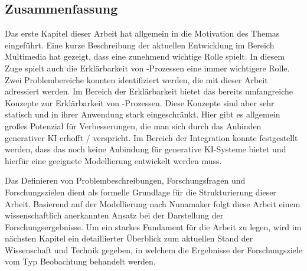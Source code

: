 
%


\subsection{Zusammenfassung}
\label{sec1:intro:subsec:summary}
Das erste Kapitel dieser Arbeit hat allgemein in die Motivation des Themas eingeführt.
Eine kurze Beschreibung der aktuellen Entwicklung im Bereich Multimedia hat gezeigt, dass \mmir{} eine zunehmend wichtige Rolle spielt.
In diesem Zuge spielt auch die Erklärbarkeit von \mmir{}-Prozessen eine immer wichtigere Rolle.
Zwei Problembereiche konnten identifiziert werden, die mit dieser Arbeit adressiert werden.
Im Bereich der Erklärbarkeit bietet das \gmaf{} bereits umfangreiche Konzepte zur Erklärbarkeit von \mmir{}-Prozessen.
Diese Konzepte sind aber sehr statisch und in ihrer Anwendung stark eingeschränkt.
Hier gibt es allgemein großes Potenzial für Verbesserungen, die man sich durch das Anbinden generativer KI erhofft / verspricht.
Im Bereich der Integration konnte festgestellt werden, dass das \gmaf{} noch keine Anbindung für generative KI-Systeme bietet und hierfür eine geeignete Modellierung entwickelt werden muss.

Das Definieren von Problembeschreibungen, Forschungsfragen und Forschungszielen dient als formelle Grundlage für die Strukturierung dieser Arbeit.
Basierend auf der Modellierung nach Nunamaker folgt diese Arbeit einem wissenschaftlich anerkannten Ansatz bei der Darstellung der Forschungsergebnisse.
Um ein starkes Fundament für die Arbeit zu legen, wird im nächsten Kapitel ein detaillierter Überblick zum aktuellen Stand der Wissenschaft und Technik gegeben, in welchem die Ergebnisse der Forschungsziele vom Typ Beobachtung behandelt werden.
